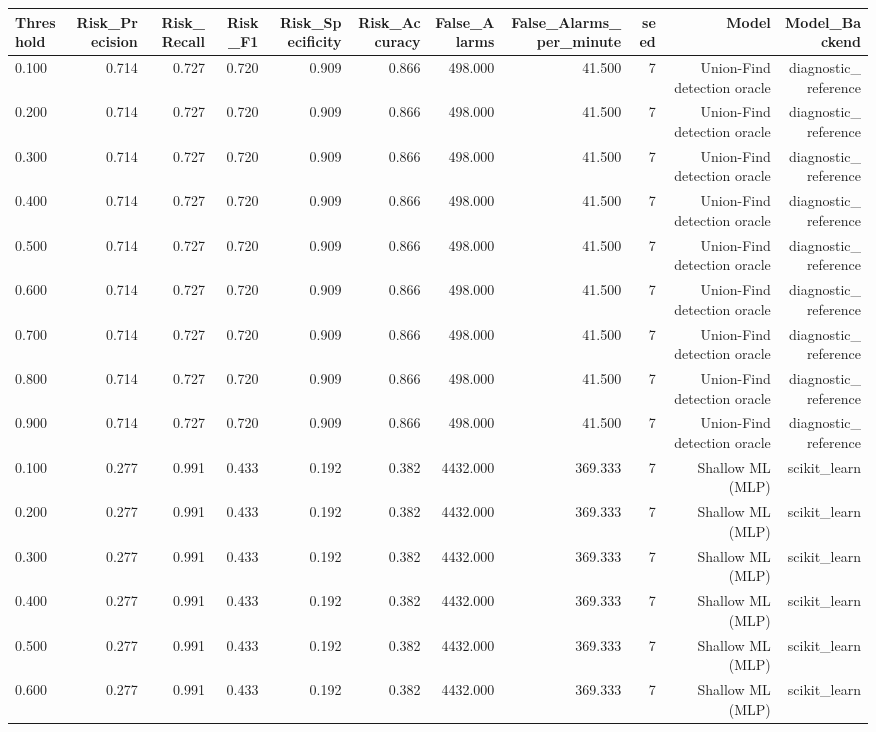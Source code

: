 \begin{tabular}{lrrrrrrrrrr}
\toprule
Threshold & Risk\_Precision & Risk\_Recall & Risk\_F1 & Risk\_Specificity & Risk\_Accuracy & False\_Alarms & False\_Alarms\_per\_minute & seed & Model & Model\_Backend \\
\midrule
0.100 & 0.714 & 0.727 & 0.720 & 0.909 & 0.866 & 498.000 & 41.500 & 7 & Union-Find detection oracle & diagnostic\_reference \\
0.200 & 0.714 & 0.727 & 0.720 & 0.909 & 0.866 & 498.000 & 41.500 & 7 & Union-Find detection oracle & diagnostic\_reference \\
0.300 & 0.714 & 0.727 & 0.720 & 0.909 & 0.866 & 498.000 & 41.500 & 7 & Union-Find detection oracle & diagnostic\_reference \\
0.400 & 0.714 & 0.727 & 0.720 & 0.909 & 0.866 & 498.000 & 41.500 & 7 & Union-Find detection oracle & diagnostic\_reference \\
0.500 & 0.714 & 0.727 & 0.720 & 0.909 & 0.866 & 498.000 & 41.500 & 7 & Union-Find detection oracle & diagnostic\_reference \\
0.600 & 0.714 & 0.727 & 0.720 & 0.909 & 0.866 & 498.000 & 41.500 & 7 & Union-Find detection oracle & diagnostic\_reference \\
0.700 & 0.714 & 0.727 & 0.720 & 0.909 & 0.866 & 498.000 & 41.500 & 7 & Union-Find detection oracle & diagnostic\_reference \\
0.800 & 0.714 & 0.727 & 0.720 & 0.909 & 0.866 & 498.000 & 41.500 & 7 & Union-Find detection oracle & diagnostic\_reference \\
0.900 & 0.714 & 0.727 & 0.720 & 0.909 & 0.866 & 498.000 & 41.500 & 7 & Union-Find detection oracle & diagnostic\_reference \\
0.100 & 0.277 & 0.991 & 0.433 & 0.192 & 0.382 & 4432.000 & 369.333 & 7 & Shallow ML (MLP) & scikit\_learn \\
0.200 & 0.277 & 0.991 & 0.433 & 0.192 & 0.382 & 4432.000 & 369.333 & 7 & Shallow ML (MLP) & scikit\_learn \\
0.300 & 0.277 & 0.991 & 0.433 & 0.192 & 0.382 & 4432.000 & 369.333 & 7 & Shallow ML (MLP) & scikit\_learn \\
0.400 & 0.277 & 0.991 & 0.433 & 0.192 & 0.382 & 4432.000 & 369.333 & 7 & Shallow ML (MLP) & scikit\_learn \\
0.500 & 0.277 & 0.991 & 0.433 & 0.192 & 0.382 & 4432.000 & 369.333 & 7 & Shallow ML (MLP) & scikit\_learn \\
0.600 & 0.277 & 0.991 & 0.433 & 0.192 & 0.382 & 4432.000 & 369.333 & 7 & Shallow ML (MLP) & scikit\_learn \\

\end{tabular}
